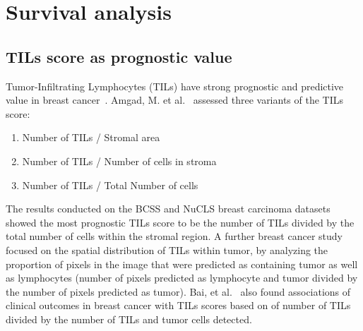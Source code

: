 \section{Survival analysis}
\subsection{TILs score as prognostic value}
Tumor-Infiltrating Lymphocytes (TILs) have strong prognostic and predictive value in breast cancer~\cite{kos2020pitfalls, amgad2022mutils}. Amgad, M. et al.~\cite{amgad2022mutils} assessed three variants of the TILs score:
\begin{enumerate}
    \item Number of TILs / Stromal area 
    \item Number of TILs / Number of cells in stroma
    \item Number of TILs / Total Number of cells 
\end{enumerate}
The results conducted on the BCSS and NuCLS breast carcinoma datasets~\cite{amgad2019structured, amgad2021nucls} showed the most prognostic TILs score to be the number of TILs divided by the total number of cells within the stromal region.
A further breast cancer study~\cite{le2020utilizing} focused on the spatial distribution of TILs within tumor, by analyzing the proportion of pixels in the image that were predicted as containing tumor as well as lymphocytes (number of pixels predicted as lymphocyte and tumor divided by the number of pixels predicted as tumor).
Bai, et al.~\cite{bai2021open} also found associations of clinical outcomes in breast cancer with TILs scores based on
of number of TILs divided by the number of TILs and tumor cells detected.

